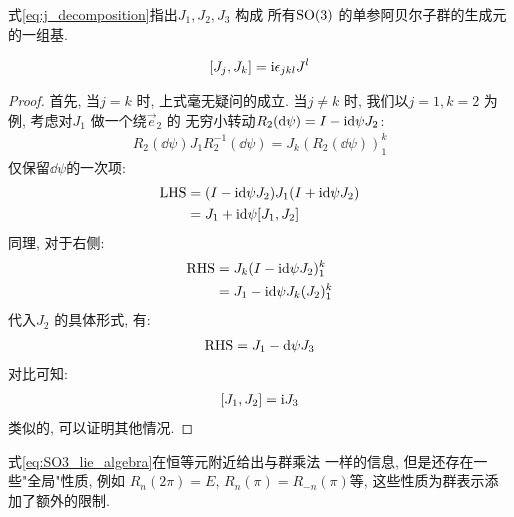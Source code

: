 式\ref{eq:j_decomposition}指出$J_1, J_2, J_3$ 构成
所有${\rm SO}(3)$ 的单参阿贝尔子群的生成元的一组基.

\begin{theorem}
  \begin{equation}\label{eq:SO3_lie_algebra}
    \begin{aligned}
      [J_{j}, J_{k}] = {\rm i} \epsilon_{jkl}J^{l}
    \end{aligned}
  \end{equation}
\end{theorem}
\begin{proof}
  首先, 当$j=k$ 时, 上式毫无疑问的成立. 当$j\neq k$ 时,
  我们以$j=1, k=2$ 为例, 考虑对$J_1$ 做一个绕$\vec{e}_{2}$ 的
  无穷小转动$R_2(\dd \psi) = I - {\rm i} \dd \psi J_2$:
  \begin{equation}
    \begin{aligned}
      R_2(\dd \psi)J_1 R_2^{-1}(\dd \psi) = J_{k}(R_2(\dd \psi))^{k}_{1}
    \end{aligned}
  \end{equation}
  仅保留$\dd \psi$的一次项:
   \begin{equation}
    \begin{aligned}
      {\rm LHS} &= (I - {\rm i}\dd \psi J_2)J_1 (I+{\rm i}\dd \psi J_2)\\
                &= J_1 + {\rm i}\dd \psi[J_1, J_2]
    \end{aligned}
  \end{equation}
  同理, 对于右侧:
  \begin{equation}
    \begin{aligned}
      {\rm RHS} &= J_{k}(I- {\rm i}\dd \psi J_2)^{k}_{1} \\
                &= J_1 - {\rm i}\dd \psi J_{k} (J_2)^{k}_{1}
    \end{aligned}
  \end{equation}
  代入$J_2$ 的具体形式, 有:
  \begin{equation}
    \begin{aligned}
      {\rm RHS} = J_1 -\dd \psi J_{3}
    \end{aligned}
  \end{equation}
  对比可知:
  \begin{equation}
    \begin{aligned}
      [J_1, J_2] = {\rm i} J_{3}
    \end{aligned}
  \end{equation}
  类似的, 可以证明其他情况.
\end{proof}

\begin{remark}
  式\ref{eq:SO3_lie_algebra}在恒等元附近给出与群乘法
  一样的信息, 但是还存在一些"全局"性质, 例如 $R_{n}(2 \pi)=E$,
  $R_{n}(\pi)=R_{-n}(\pi)$等, 这些性质为群表示添加了额外的限制.
\end{remark}
